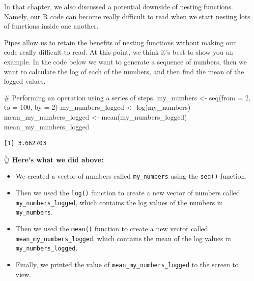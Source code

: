 \documentclass[
  letterpaper,
  DIV=11,
  numbers=noendperiod]{scrreprt}
\newenvironment{Shaded}{\begin{snugshade}}{\end{snugshade}}
\newcommand{\AttributeTok}[1]{\textcolor[rgb]{0.40,0.45,0.13}{#1}}
\newcommand{\CommentTok}[1]{\textcolor[rgb]{0.37,0.37,0.37}{#1}}
\newcommand{\DecValTok}[1]{\textcolor[rgb]{0.68,0.00,0.00}{#1}}
\newcommand{\FunctionTok}[1]{\textcolor[rgb]{0.28,0.35,0.67}{#1}}
\newcommand{\NormalTok}[1]{\textcolor[rgb]{0.00,0.23,0.31}{#1}}
\newcommand{\OtherTok}[1]{\textcolor[rgb]{0.00,0.23,0.31}{#1}}
\providecommand{\tightlist}{%
  \setlength{\itemsep}{0pt}\setlength{\parskip}{0pt}}\usepackage{longtable,booktabs,array}
\begin{document}
In that chapter, we also discussed a potential downside of nesting
functions. Namely, our R code can become really difficult to read when
we start nesting lots of functions inside one another.

Pipes allow us to retain the benefits of nesting functions without
making our code really difficult to read. At this point, we think it's
best to show you an example. In the code below we want to generate a
sequence of numbers, then we want to calculate the log of each of the
numbers, and then find the mean of the logged values.

\begin{Shaded}
\begin{Highlighting}[]
\CommentTok{\# Performing an operation using a series of steps.}
\NormalTok{my\_numbers }\OtherTok{\textless{}{-}} \FunctionTok{seq}\NormalTok{(}\AttributeTok{from =} \DecValTok{2}\NormalTok{, }\AttributeTok{to =} \DecValTok{100}\NormalTok{, }\AttributeTok{by =} \DecValTok{2}\NormalTok{)}
\NormalTok{my\_numbers\_logged }\OtherTok{\textless{}{-}} \FunctionTok{log}\NormalTok{(my\_numbers)}
\NormalTok{mean\_my\_numbers\_logged }\OtherTok{\textless{}{-}} \FunctionTok{mean}\NormalTok{(my\_numbers\_logged)}
\NormalTok{mean\_my\_numbers\_logged}
\end{Highlighting}
\end{Shaded}

\begin{verbatim}
[1] 3.662703
\end{verbatim}

👆 \textbf{Here's what we did above:}

\begin{itemize}
\tightlist
\item
  We created a vector of numbers called \texttt{my\_numbers} using the
  \texttt{seq()} function.\\
\item
  Then we used the \texttt{log()} function to create a new vector of
  numbers called \texttt{my\_numbers\_logged}, which contains the log
  values of the numbers in \texttt{my\_numbers}.\\
\item
  Then we used the \texttt{mean()} function to create a new vector
  called \texttt{mean\_my\_numbers\_logged}, which contains the mean of
  the log values in \texttt{my\_numbers\_logged}.\\
\item
  Finally, we printed the value of \texttt{mean\_my\_numbers\_logged} to
  the screen to view.
\end{itemize}
\end{document}

